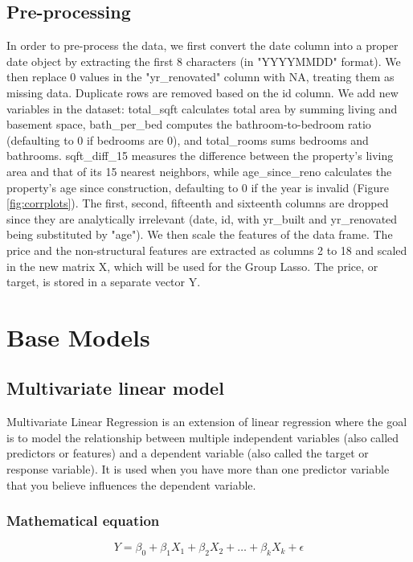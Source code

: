 \documentclass[a4paper, 12pt]{article}
\begin{document}
\begin{multicols}{2}
\subsection{Pre-processing} \vspace{-3pt}
In order to pre-process the data, we first convert the date column into a proper date object by extracting the first 8 characters (in "YYYYMMDD" format). We then replace 0 values in the "yr{\_}renovated" column with NA, treating them as missing data. Duplicate rows are removed based on the id column.
We add new variables in the dataset: total{\_}sqft calculates total area by summing living and basement space, bath{\_}per{\_}bed computes the bathroom-to-bedroom ratio (defaulting to 0 if bedrooms are 0), and total{\_}rooms sums bedrooms and bathrooms. sqft{\_}diff{\_}15 measures the difference between the property’s living area and that of its 15 nearest neighbors, while age{\_}since{\_}reno calculates the property’s age since construction, defaulting to 0 if the year is invalid (Figure \ref{fig:corrplots}).
The first, second, fifteenth and sixteenth columns are dropped since they are analytically irrelevant (date, id, with yr{\_}built and yr{\_}renovated being substituted by "age"). We then scale the features of the data frame.
The price and the non-structural features are extracted as columns 2 to 18 and scaled in the new matrix X, which will be used for the Group Lasso. The price, or target, is stored in a separate vector Y.

\section{Base Models} \vspace{-7pt}
\subsection{Multivariate linear model} \vspace{-3pt}
Multivariate Linear Regression is an extension of linear regression where the goal is to model the relationship between multiple independent variables (also called predictors or features) and a dependent variable (also called the target or response variable). It is used when you have more than one predictor variable that you believe influences the dependent variable.

\subsubsection*{Mathematical equation}
\begin{equation}
Y=\beta_0+\beta_1X_1+\beta_2X_2+\dots+\beta_kX_k+\epsilon
\end{equation}


\end{multicols}
\end{document}
